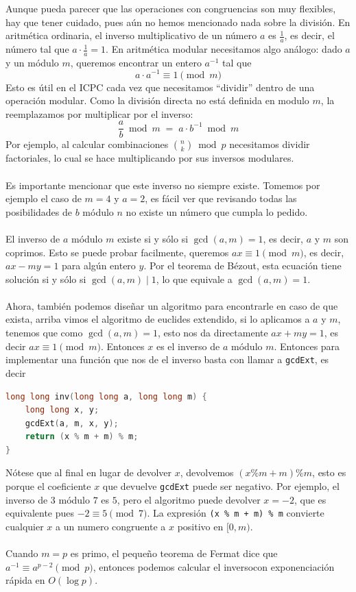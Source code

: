 Aunque pueda parecer que las operaciones con congruencias son muy flexibles, hay que tener cuidado, pues aún no hemos mencionado nada sobre la división. En aritmética ordinaria, el inverso multiplicativo de un número $a$ es $\frac{1}{a}$, es decir, el número tal que $a \cdot \frac{1}{a} = 1$. En aritmética modular necesitamos algo análogo: dado $a$ y un módulo $m$, queremos encontrar un entero $a^{-1}$ tal que
\[
a \cdot a^{-1} \equiv 1 \pmod{m}
\]
Esto es útil en el ICPC cada vez que necesitamos ``dividir'' dentro de una operación modular. Como la división directa no está definida en modulo $m$, la reemplazamos por multiplicar por el inverso:
\[
\frac{a}{b} \bmod m \;=\; a \cdot b^{-1} \bmod m
\]
Por ejemplo, al calcular combinaciones $\binom{n}{k} \bmod p$ necesitamos dividir factoriales, lo cual se hace multiplicando por sus inversos modulares.
\\\\
Es importante mencionar que este inverso no siempre existe. Tomemos por ejemplo el caso de $m=4$ y $a=2$, es fácil ver que revisando todas las posibilidades de $b$ módulo $n$ no existe un número que cumpla lo pedido.
\\\\El inverso de $a$ módulo $m$ existe si y sólo si $\gcd(a, m) = 1$, es decir, $a$ y $m$ son coprimos. Esto se puede probar facilmente, queremos $ax \equiv 1 \pmod{m}$, es decir, $ax - my = 1$ para algún entero $y$. Por el teorema de Bézout, esta ecuación tiene solución si y sólo si $\gcd(a,m) \mid 1$, lo que equivale a $\gcd(a,m) = 1$.
\\\\
Ahora, también podemos diseñar un algoritmo para encontrarle en caso de que exista, arriba vimos el algoritmo de euclides extendido, si lo aplicamos a $a$ y $m$, tenemos que como $\gcd(a,m) = 1$, esto nos da directamente $ax + my = 1$, es decir $ax \equiv 1 \pmod{m}$. Entonces $x$ es el inverso de $a$ módulo $m$. Entonces para implementar una función que nos de el inverso basta con llamar a \texttt{gcdExt}, es decir
\begin{lstlisting}[language=C++]
long long inv(long long a, long long m) {
    long long x, y;
    gcdExt(a, m, x, y);
    return (x % m + m) % m;  
}
\end{lstlisting}
Nótese que al final en lugar de devolver $x$, devolvemos $(x \% m + m) \% m$, esto es porque el coeficiente $x$ que devuelve \texttt{gcdExt} puede ser negativo. Por ejemplo, el inverso de $3$ módulo $7$ es $5$, pero el algoritmo puede devolver $x = -2$, que es equivalente pues $-2 \equiv 5 \pmod 7$. La expresión \texttt{(x \% m + m) \% m} convierte cualquier $x$ a un numero congruente a $x$ positivo en $[0, m)$.
\\
\\Cuando $m = p$ es primo, el pequeño teorema de Fermat dice que $a^{-1} \equiv a^{p-2} \pmod{p}$, entonces podemos calcular el inversocon exponenciación rápida en $O(\log p)$.
\\

